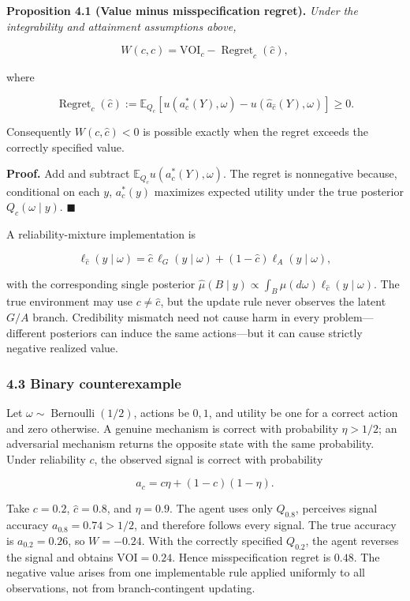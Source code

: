 \documentclass[
  11pt]{article}
\begin{document}
\textbf{Proposition 4.1 (Value minus misspecification regret).}
\emph{Under the integrability and attainment assumptions above,}

\[W(c,\hat c)=\mathrm{VOI}_c-\operatorname{Regret}_c(\hat c),\tag{4}\]

where

\[\operatorname{Regret}_c(\hat c):=\mathbb E_{Q_c}\!\left[u(a_c^*(Y),\omega)-u(\widehat a_{\hat c}(Y),\omega)\right]\ge0.\]

Consequently \(W(c,\hat c)<0\) is possible exactly when the regret
exceeds the correctly specified value.

\textbf{Proof.} Add and subtract \(\mathbb E_{Q_c}u(a_c^*(Y),\omega)\).
The regret is nonnegative because, conditional on each \(y\),
\(a_c^*(y)\) maximizes expected utility under the true posterior
\(Q_c(\omega\mid y)\). \(\blacksquare\)

A reliability-mixture implementation is

\[\ell_{\hat c}(y\mid\omega)=\hat c\,\ell_G(y\mid\omega)+(1-\hat c)\ell_A(y\mid\omega),\]

with the corresponding single posterior
\(\widehat\mu(B\mid y)\propto\int_B\mu(d\omega)\ell_{\hat c}(y\mid\omega)\).
The true environment may use \(c\ne\hat c\), but the update rule never
observes the latent \(G/A\) branch. Credibility mismatch need not cause
harm in every problem---different posteriors can induce the same
actions---but it can cause strictly negative realized value.

\subsubsection{4.3 Binary counterexample}\label{binary-counterexample}

Let \(\omega\sim\operatorname{Bernoulli}(1/2)\), actions be \(0,1\), and
utility be one for a correct action and zero otherwise. A genuine
mechanism is correct with probability \(\eta>1/2\); an adversarial
mechanism returns the opposite state with the same probability. Under
reliability \(c\), the observed signal is correct with probability

\[a_c=c\eta+(1-c)(1-\eta).\]

Take \(c=0.2\), \(\hat c=0.8\), and \(\eta=0.9\). The agent uses only
\(Q_{0.8}\), perceives signal accuracy \(a_{0.8}=0.74>1/2\), and
therefore follows every signal. The true accuracy is \(a_{0.2}=0.26\),
so \(W=-0.24\). With the correctly specified \(Q_{0.2}\), the agent
reverses the signal and obtains \(\mathrm{VOI}=0.24\). Hence
misspecification regret is \(0.48\). The negative value arises from one
implementable rule applied uniformly to all observations, not from
branch-contingent updating.
\end{document}
